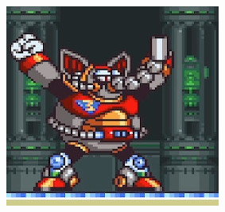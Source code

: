 \begin{figure}[h]
\begin{subfigure}{0.5\textwidth}
		\caption{}
	\end{subfigure}
	\begin{subfigure}{0.3\textwidth}
		\centering
		\includegraphics[width=\linewidth]{figures/X1/Mammoth_trunk.jpg}
		\caption{}
	\end{subfigure}
	\end{figure}


